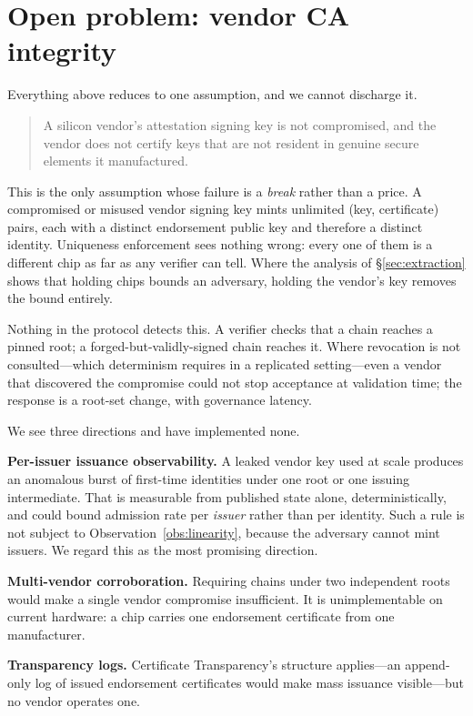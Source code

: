 \documentclass[conference,10pt]{IEEEtran}
\begin{document}
\section{Open problem: vendor CA integrity}
\label{sec:open}

Everything above reduces to one assumption, and we cannot discharge it.

\begin{quote}
A silicon vendor's attestation signing key is not compromised, and the vendor does not certify keys that
are not resident in genuine secure elements it manufactured.
\end{quote}

This is the only assumption whose failure is a \emph{break} rather than a price. A compromised or misused
vendor signing key mints unlimited (key, certificate) pairs, each with a distinct endorsement public key
and therefore a distinct identity. Uniqueness enforcement sees nothing wrong: every one of them is a
different chip as far as any verifier can tell. Where the analysis of \S\ref{sec:extraction} shows that
holding chips bounds an adversary, holding the vendor's key removes the bound entirely.

Nothing in the protocol detects this. A verifier checks that a chain reaches a pinned root; a
forged-but-validly-signed chain reaches it. Where revocation is not consulted---which determinism
requires in a replicated setting---even a vendor that discovered the compromise could not stop
acceptance at validation time; the response is a root-set change, with governance latency.

We see three directions and have implemented none.

\textbf{Per-issuer issuance observability.} A leaked vendor key used at scale produces an anomalous burst
of first-time identities under one root or one issuing intermediate. That is measurable from published
state alone, deterministically, and could bound admission rate per \emph{issuer} rather than per
identity. Such a rule is not subject to Observation~\ref{obs:linearity}, because the adversary cannot
mint issuers. We regard this as the most promising direction.

\textbf{Multi-vendor corroboration.} Requiring chains under two independent roots would make a single
vendor compromise insufficient. It is unimplementable on current hardware: a chip carries one endorsement
certificate from one manufacturer.

\textbf{Transparency logs.} Certificate Transparency's structure applies---an append-only log of issued
endorsement certificates would make mass issuance visible---but no vendor operates one.
\end{document}
